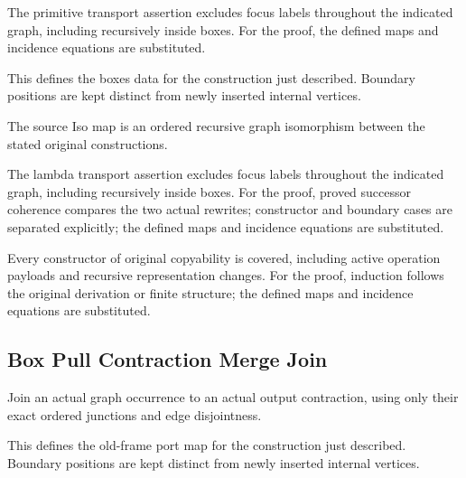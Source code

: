 The primitive transport assertion excludes focus labels throughout the indicated graph, including recursively inside boxes.
For the proof, the defined maps and incidence equations are substituted.
\par{}

This defines the boxes data for the construction just described. Boundary positions are kept distinct from newly inserted internal vertices.
\par{}

The source Iso map is an ordered recursive graph isomorphism between the stated original constructions.
\par{}

The lambda transport assertion excludes focus labels throughout the indicated graph, including recursively inside boxes.
For the proof, proved successor coherence compares the two actual rewrites; constructor and boundary cases are separated explicitly; the defined maps and incidence equations are substituted.
\par{}

Every constructor of original copyability is covered, including active operation payloads and recursive representation changes.
For the proof, induction follows the original derivation or finite structure; the defined maps and incidence equations are substituted.
\par{}

\subsection{Box Pull Contraction Merge Join}
Join an actual graph occurrence to an actual output contraction, using only their exact ordered junctions and edge disjointness.

This defines the old-frame port map for the construction just described. Boundary positions are kept distinct from newly inserted internal vertices.
\par{}

